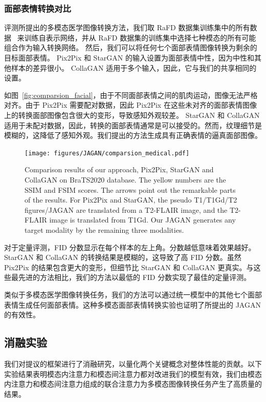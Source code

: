 \subsubsection{面部表情转换对比}
评测所提出的多模态医学图像转换方法，我们取 RaFD 数据集训练集中的所有数据~\cite{langner2010presentation} 来训练自表示网络，并从 RaFD 数据集的训练集中选择七种模态的所有可能组合作为输入转换网络。
然后，我们可以将任何七个面部表情图像转换为剩余的目标面部表情。 Pix2Pix 和 StarGAN 的输入设置为面部表情中性，因为中性和其他样本的差异很小。 CollaGAN 适用于多个输入，因此，它与我们的共享相同的设置。

如图~\ref{fig:comparsion_facial}，由于不同面部表情之间的肌肉运动，图像无法严格对齐。由于 Pix2Pix 需要配对数据，因此 Pix2Pix 在这些未对齐的面部表情图像上的转换面部图像包含很大的变形，导致感知外观较差。 StarGAN 和 CollaGAN 适用于未配对数据，因此，转换的面部表情通常是可以接受的。然而，纹理细节是模糊的，这降低了感知外观。我们提出的方法生成具有正确表情的逼真面部图像。

\begin{figure}
	\begin{center}
		\texttt{[image: figures/JAGAN/comparsion\_medical.pdf]}
	\end{center}
	\caption{Comparison results of our approach, Pix2Pix, StarGAN and CollaGAN on BraTS2020 database. The yellow numbers are the SSIM and FSIM scores. The arrows point out the remarkable parts of the results. For Pix2Pix and StarGAN, the pseudo T1/T1Gd/T2 figures/JAGAN are translated from a T2-FLAIR image, and the T2-FLAIR image is translated from T1Gd. Our JAGAN generates any target modality by the remaining three modalities.}
	\label{fig:comparsion_medical}
\end{figure}

对于定量评测，FID 分数显示在每个样本的左上角。分数越低意味着效果越好。 StarGAN 和 CollaGAN 的转换结果是模糊的，这导致了高 FID 分数。虽然 Pix2Pix 的结果包含更大的变形，但细节比 StarGAN 和 CollaGAN 更真实。与这些最先进的方法相比，我们的方法以最低的 FID 分数实现了最佳的定量评测。

类似于多模态医学图像转换任务，我们的方法可以通过统一模型中的其他七个面部表情生成任何面部表情。这种多模态面部表情转换实验也证明了所提出的 JAGAN 的有效性。

\subsection{消融实验}

我们对提议的框架进行了消融研究，以量化两个关键概念对整体性能的贡献。以下实验结果表明模态内注意力和模态间注意力都对改进我们的模型有效，我们由模态内注意力和模态间注意力组成的联合注意力为多模态图像转换任务产生了高质量的结果。

